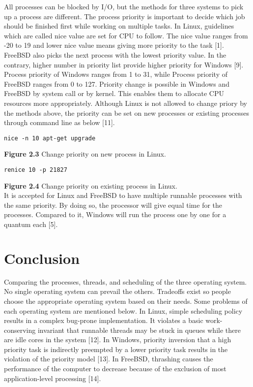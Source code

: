 \documentclass[10pt,draftclsnofoot,journal,compsoc,onecolumn]{IEEEtran}
\begin{document}
All processes can be blocked by I/O, but the methods for three systems to pick up a process are different. The process priority is important to decide which job should be finished first while working on multiple tasks. In Linux, guidelines which are called nice value are set for CPU to follow. The nice value ranges from -20 to 19 and lower nice value means giving more priority to the task [1]. FreeBSD also picks the next process with the lowest priority value. In the contrary, higher number in priority list provide higher priority for Windows [9]. Process priority of Windows ranges from 1 to 31, while Process priority of FreeBSD ranges from 0 to 127. Priority change is possible in Windows and FreeBSD by system call or by kernel. This enables them to allocate CPU resources more appropriately. Although Linux is not allowed to change priory by the methods above, the priority can be set on new processes or existing processes through command line as below [11]. \\

\begin{lstlisting}[style=CStyle]
nice -n 10 apt-get upgrade
\end{lstlisting}
\textbf{Figure 2.3} Change priority on new process in Linux. \\

\begin{lstlisting}[style=CStyle]
renice 10 -p 21827
\end{lstlisting}
\textbf{Figure 2.4} Change priority on existing process in Linux. \\

It is accepted for Linux and FreeBSD to have multiple runnable processes with the same priority. By doing so, the processor will give equal time for the processes. Compared to it, Windows will run the process one by one for a quantum each [5].

\section{Conclusion}
Comparing the processes, threads, and scheduling of the three operating system. No single operating system can prevail the others. Tradeoffs exist so people choose the appropriate operating system based on their needs. Some problems of each operating system are mentioned below. In Linux, simple scheduling policy results in a complex bug-prone implementation. It violates a basic work-conserving invariant that runnable threads may be stuck in queues while there are idle cores in the system [12]. In Windows, priority inversion that a high priority task is indirectly preempted by a lower priority task results in the violation of the priority model [13]. In FreeBSD, thrashing causes the performance of the computer to decrease because of the exclusion of most application-level processing [14].
\end{document}
